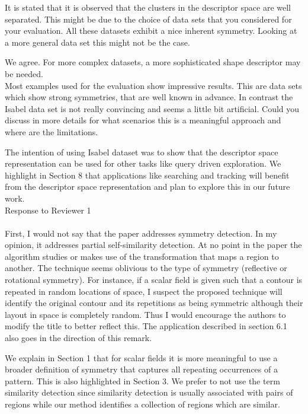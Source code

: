 \documentclass[10pt]{article}
\begin{document}
   It is stated that it is observed that the clusters in the descriptor
   space are well separated. This might be due to the choice of data sets
   that you considered for your evaluation. All these datasets exhibit a
   nice inherent symmetry. Looking at a more general data set this might not
   be the case.

   {\color{blue} We agree. For more complex datasets, a more sophisticated
   shape descriptor may be needed.}\\

	
   Most examples used for the evaluation show impressive results. This are
   data sets which show strong symmetries, that are well known in advance.
   In contrast the Isabel data set is not really convincing and seems a
   little bit artificial. Could you discuss in more details for what
   scenarios this is a meaningful approach and where are the limitations.

   {\color{blue}The intention of using Isabel dataset was to show that the descriptor space representation
	   can be used for other tasks like query driven exploration. We highlight in Section 8
	   that applications like searching and tracking will benefit from the descriptor
   space representation and plan to explore this in our future work.}\\

{\noindent \LARGE Response to Reviewer 1}\\\\
   First, I would not say that the paper addresses symmetry detection. In my
   opinion, it addresses partial self-similarity detection. At no point in
   the paper the algorithm studies or makes use of the transformation that
   maps a region to another. The technique seems oblivious to the type of
   symmetry (reflective or rotational symmetry). For instance, if a scalar
   field is given such that a contour is repeated in random locations of
   space, I suspect the proposed technique will identify the original
   contour and its repetitions as being symmetric although their layout in
   space is completely random. Thus I would encourage the authors to modify
   the title to better reflect this. The application described in section
   6.1 also goes in the direction of this remark.

	
   {\color{blue}We explain in Section 1 that for scalar fields it is more
	   meaningful to use a broader definition of symmetry that captures
	   all repeating occurrences of a pattern. This is also highlighted in
	   Section 3. We prefer to not use the term similarity detection
	   since similarity detection is usually associated with pairs of regions
   	   while our method identifies a collection of regions which are similar.}\\
\end{document}
